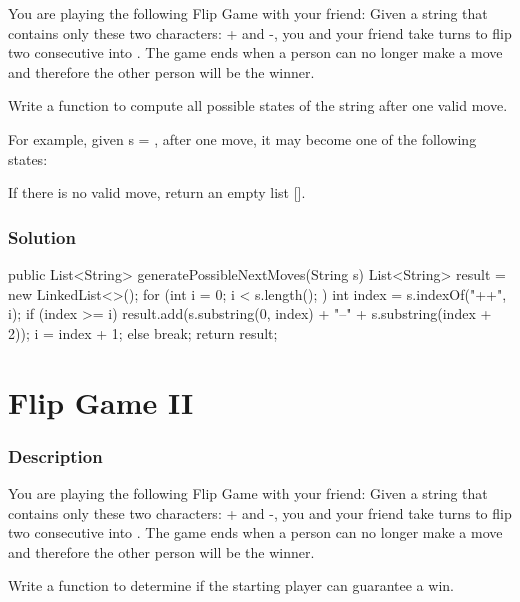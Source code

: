 You are playing the following Flip Game with your friend: Given a string that contains only these two characters: + and -, you and your friend take turns to flip two consecutive  into . The game ends when a person can no longer make a move and therefore the other person will be the winner.

Write a function to compute all possible states of the string after one valid move.

For example, given s = , after one move, it may become one of the following states:

\begin{Code}
[
  "--++",
  "+--+",
  "++--"
]
\end{Code}

If there is no valid move, return an empty list [].

\subsubsection{Solution}

\begin{Code}
public List<String> generatePossibleNextMoves(String s) {
    List<String> result = new LinkedList<>();
    for (int i = 0; i < s.length(); ) {
        int index = s.indexOf("++", i);
        if (index >= i) {
            result.add(s.substring(0, index) + "--" + s.substring(index + 2));
            i = index + 1;
        } else {
            break;
        }
    }
    return result;
}
\end{Code}

\newpage

\section{Flip Game II} %
\subsubsection{Description}

You are playing the following Flip Game with your friend: Given a string that contains only these two characters: + and -, you and your friend take turns to flip two consecutive  into . The game ends when a person can no longer make a move and therefore the other person will be the winner.

Write a function to determine if the starting player can guarantee a win.

